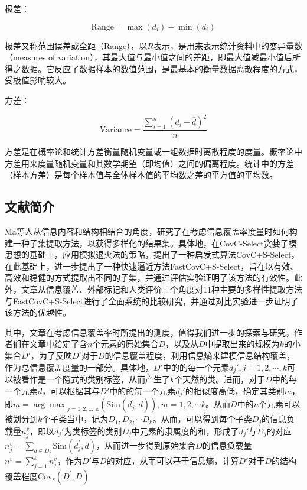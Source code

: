 \documentclass{../notes}
\newcommand{\Cov}{\text{Cov}}
\newcommand{\Sim}{\text{Sim}}
\begin{document}
    \begin{definition}
        极差：

        \begin{equation}
            \text{Range}=\max{\left(d_i\right)}-\min(d_i)
        \end{equation}

        极差又称范围误差或全距（Range），以$R$表示，是用来表示统计资料中的变异量数（measures of variation），其最大值与最小值之间的差距，即最大值减最小值后所得之数据。它反应了数据样本的数值范围，是最基本的衡量数据离散程度的方式，受极值影响较大。
    \end{definition}

    \begin{definition}
        方差：

        \begin{equation}
            \text{Variance}=\frac{\sum_{i=1}^{n}\left(d_i-\bar{d}\right)^2}{n}
        \end{equation}

        方差是在概率论和统计方差衡量随机变量或一组数据时离散程度的度量。概率论中方差用来度量随机变量和其数学期望（即均值）之间的偏离程度。统计中的方差（样本方差）是每个样本值与全体样本值的平均数之差的平方值的平均数。
    \end{definition}

    \subsection{文献简介}

    Ma等人从信息内容和结构相结合的角度，研究了在考虑信息覆盖率度量时如何构建一种子集提取方法，以获得多样化的结果集。具体地，在CovC-Select贪婪子模思想的基础上，应用模拟退火法的策略，提出了一种启发式算法CovC+S-Select。在此基础上，进一步提出了一种快速逼近方法FastCovC+S-Select，旨在以有效、高效和稳健的方式提取出不同的子集，并通过评估实验证明了该方法的有效性。此外，文章从信息覆盖、外部标记和人类评价三个角度对11种主要的多样性提取方法与FastCovC+S-Select进行了全面系统的比较研究，并通过对比实验进一步证明了该方法的优越性。

    其中，文章在考虑信息覆盖率时所提出的测度，值得我们进一步的探索与研究，作者们在文章中给定了含$n$个元素的原始集合$D$，以及从$D$中提取出来的规模为$k$的小集合$D'$，为了反映$D'$对于$D$的信息覆盖程度，利用信息熵来建模信息结构覆盖，作为总信息覆盖度量的一部分。具体地，$D'$中的的每一个元素$d_j', j=1,2,\cdots,k$可以被看作是一个隐式的类别标签，从而产生了$k$个天然的类。进而，对于$D$中的每一个元素$d$，可以根据其与$D'$中的的每一个元素$d_j'$的相似度高低，确定其类别$m$，即$m={\arg\max}_{j=1,2,\ldots,k}\left(\Sim\left(d_j^\prime,d\right)\right), m=1,2,\cdots k$。从而$D$中的$n$个元素可以被划分到$k$个子类当中，记为$D_1, D_2, \cdots D_k$。从而，可以得到每个子类$D_j$的信息负载量$n_j^v$，即以$d_j'$为类标签的类别$D_j$中元素的隶属度的和，形成了$d_j'$与$D_j$的对应$n_j^v=\sum_{d\in D_j} \Sim\left(d_j^\prime,d\right)$，从而进一步得到原始集合$D$的信息负载量$n^v=\sum_{j=1}^{k}n_j^v$，作为$D'$与$D$的对应，从而可以基于信息熵，计算$D'$对于$D$的结构覆盖程度$\Cov_s(D^\prime,D)$
\end{document}

